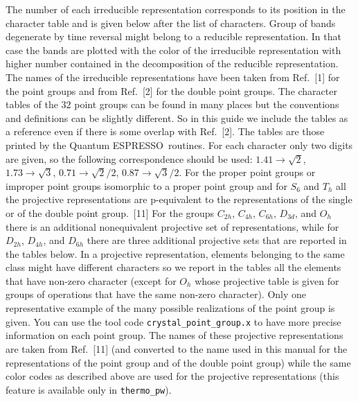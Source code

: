 \documentclass[12pt,a4paper,twoside]{report}
\def\qe{{\sc Quantum ESPRESSO}}
\begin{document}
The number of each irreducible representation corresponds to its position
in the character table and is given below after the list of characters. 
Group of bands degenerate by time reversal might belong to a reducible
representation. In that case the bands are plotted with the color of the
irreducible representation with higher number contained in the decomposition
of the reducible representation.
The names of the irreducible representations have been taken from Ref.~[1]
for the point groups and from Ref.~[2] for the double point groups. 
The character tables of the $32$ point groups can be found in many places 
but the conventions and definitions can be slightly different. So in
this guide we include the tables as a reference even if there is some 
overlap with Ref.~[2]. The tables are those printed by the \qe\ 
routines. For each character only two digits are given, so the
following correspondence should be used:
$1.41 \rightarrow \sqrt{2}$, $1.73 \rightarrow \sqrt{3}$, 
$0.71 \rightarrow \sqrt{2}/2$, $0.87 \rightarrow \sqrt{3}/2$.
For the proper point groups or improper point groups isomorphic to a 
proper point group and for $S_6$ and $T_h$ all the projective 
representations are p-equivalent to the representations of the single 
or of the double point group.~[11] For the groups $C_{2h}$, $C_{4h}$, $C_{6h}$,
$D_{3d}$, and $O_h$ there is an additional nonequivalent projective 
set of representations, while for $D_{2h}$, $D_{4h}$, and $D_{6h}$ there 
are three additional projective sets that are reported in the tables below.
In a projective representation, elements belonging to the 
same class might have different characters so we report in the tables all 
the elements that have non-zero character (except for $O_h$ whose
projective table is given for groups of operations that have the same
non-zero character). 
Only one representative example of the many possible realizations of 
the point group is given. You can use the tool code 
\texttt{crystal\_point\_group.x} to have more precise information
on each point group. The names 
of these projective representations are taken from Ref.~[11] (and converted
to the name used in this manual for the representations of the point group 
and of the double point group) while the same color codes as described above 
are used for the projective representations (this feature is available
only in \texttt{thermo\_pw}).
\end{document}
